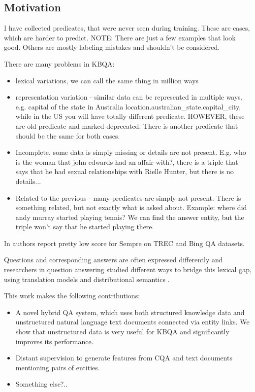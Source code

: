 

\subsection{Motivation}

I have collected predicates, that were never seen during training.
These are cases, which are harder to predict. NOTE: There are just a few examples that look good. Others are mostly labeling mistakes and shouldn't be considered.

There are many problems in KBQA:
\begin{itemize}
\item lexical variations, we can call the same thing in million ways
\item representation variation - similar data can be represented in multiple ways, e.g. capital of the state in Australia location.australian\_state.capital\_city, while in the US you will have totally different predicate. HOWEVER, these are old predicate and marked deprecated. There is another predicate that should be the same for both cases.
\item Incomplete, some data is simply missing or details are not present. E.g. who is the woman that john edwards had an affair with?, there is a triple that says that he had sexual relationships with Rielle Hunter, but there is no details...
\item Related to the previous - many predicates are simply not present. There is something related, but not exactly what is asked about. Example: where did andy murray started playing tennis? We can find the answer entity, but the triple won't say that he started playing there.
\end{itemize}

In \cite{Sun:2015:ODQ:2736277.2741651} authors report pretty low score for Sempre on TREC and Bing QA datasets.


Questions and corresponding answers are often expressed differently and researchers in question answering studied different ways to bridge this lexical gap, \eg using translation models \cite{Murdock:2005:TMS:1220575.1220661} and distributional semantics \cite{yu2014deep}.


This work makes the following contributions:
\begin{itemize}
\item A novel hybrid QA system, which uses both structured knowledge data and unstructured natural language text documents connected via entity links. We show that unstructured data is very useful for KBQA and significantly improves its performance.
\item Distant supervision to generate features from CQA and text documents mentioning pairs of entities.
\item Something else?..
\end{itemize}

